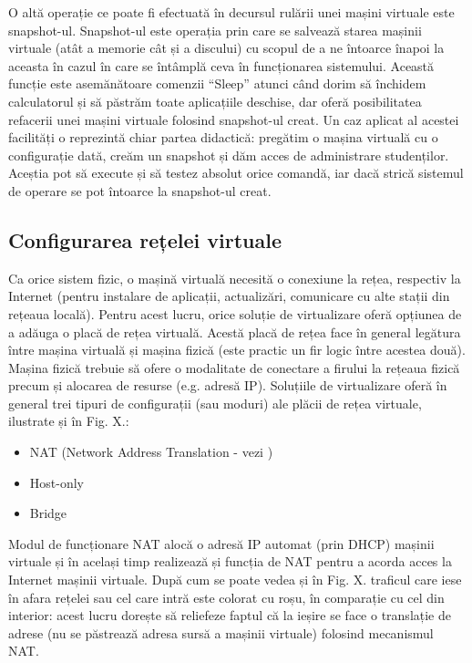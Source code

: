 O altă operație ce poate fi efectuată în decursul rulării unei mașini virtuale
este snapshot-ul. Snapshot-ul este operația prin care se salvează starea mașinii
virtuale (atât a memorie cât și a discului) cu scopul de a ne întoarce înapoi la
aceasta în cazul în care se întâmplă ceva în funcționarea sistemului. Această
funcție este asemănătoare comenzii “Sleep” atunci când dorim să închidem
calculatorul și să păstrăm toate aplicațiile deschise, dar oferă posibilitatea
refacerii unei mașini virtuale folosind snapshot-ul creat. Un caz aplicat al
acestei facilități o reprezintă chiar partea didactică: pregătim o mașina
virtuală cu o configurație dată, creăm un snapshot și dăm acces de administrare
studenților. Aceștia pot să execute și să testez absolut orice comandă, iar dacă
strică sistemul de operare se pot întoarce la snapshot-ul creat.

\subsection{Configurarea rețelei virtuale}
\label{sec:vm-ops-config}

Ca orice sistem fizic, o mașină virtuală necesită o conexiune la rețea,
respectiv la Internet (pentru instalare de aplicații, actualizări, comunicare cu
alte stații din rețeaua locală). Pentru acest lucru, orice soluție de
virtualizare oferă opțiunea de a adăuga o placă de rețea virtuală. Acestă placă
de rețea face în general legătura între mașina virtuală și mașina fizică (este
practic un fir logic între acestea două). Mașina fizică trebuie să ofere o
modalitate de conectare a firului la rețeaua fizică precum și alocarea de
resurse (e.g. adresă IP). Soluțiile de virtualizare oferă în general trei tipuri
de configurații (sau moduri) ale plăcii de rețea virtuale, ilustrate și în Fig.
X.:

\begin{itemize}
	\item NAT (Network Address Translation - vezi
		)
	\item Host-only
	\item Bridge
\end{itemize}

Modul de funcționare NAT alocă o adresă IP automat (prin DHCP) mașinii virtuale
și în același timp realizează și funcția de NAT pentru a acorda acces la
Internet mașinii virtuale. După cum se poate vedea și în Fig. X. traficul care
iese în afara rețelei sau cel care intră este colorat cu roșu, în comparație cu
cel din interior: acest lucru dorește să reliefeze faptul că la ieșire se face o
translație de adrese (nu se păstrează adresa sursă a mașinii virtuale) folosind
mecanismul NAT.

